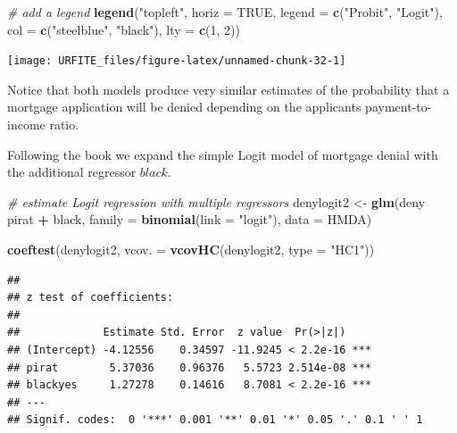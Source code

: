 \documentclass[]{book}
\newenvironment{Shaded}{\begin{snugshade}}{\end{snugshade}}
\newcommand{\KeywordTok}[1]{\textcolor[rgb]{0.13,0.29,0.53}{\textbf{#1}}}
\newcommand{\DataTypeTok}[1]{\textcolor[rgb]{0.13,0.29,0.53}{#1}}
\newcommand{\DecValTok}[1]{\textcolor[rgb]{0.00,0.00,0.81}{#1}}
\newcommand{\StringTok}[1]{\textcolor[rgb]{0.31,0.60,0.02}{#1}}
\newcommand{\CommentTok}[1]{\textcolor[rgb]{0.56,0.35,0.01}{\textit{#1}}}
\newcommand{\OtherTok}[1]{\textcolor[rgb]{0.56,0.35,0.01}{#1}}
\newcommand{\OperatorTok}[1]{\textcolor[rgb]{0.81,0.36,0.00}{\textbf{#1}}}
\newcommand{\NormalTok}[1]{#1}
\theoremstyle{definition}
\theoremstyle{definition}
\theoremstyle{definition}
\theoremstyle{remark}
\begin{document}
\begin{Shaded}
\begin{Highlighting}[]
\CommentTok{# add a legend}
\KeywordTok{legend}\NormalTok{(}\StringTok{"topleft"}\NormalTok{,}
       \DataTypeTok{horiz =} \OtherTok{TRUE}\NormalTok{,}
       \DataTypeTok{legend =} \KeywordTok{c}\NormalTok{(}\StringTok{"Probit"}\NormalTok{, }\StringTok{"Logit"}\NormalTok{),}
       \DataTypeTok{col =} \KeywordTok{c}\NormalTok{(}\StringTok{"steelblue"}\NormalTok{, }\StringTok{"black"}\NormalTok{), }
       \DataTypeTok{lty =} \KeywordTok{c}\NormalTok{(}\DecValTok{1}\NormalTok{, }\DecValTok{2}\NormalTok{))}
\end{Highlighting}
\end{Shaded}

\begin{center}\texttt{[image: URFITE\_files/figure-latex/unnamed-chunk-32-1]} \end{center}

Notice that both models produce very similar estimates of the
probability that a mortgage application will be denied depending on the
applicants payment-to-income ratio.

Following the book we expand the simple Logit model of mortgage denial
with the additional regressor \(black\).

\begin{Shaded}
\begin{Highlighting}[]
\CommentTok{# estimate Logit regression with multiple regressors}
\NormalTok{denylogit2 <-}\StringTok{ }\KeywordTok{glm}\NormalTok{(deny }\OperatorTok{~}\StringTok{ }\NormalTok{pirat }\OperatorTok{+}\StringTok{ }\NormalTok{black, }
                \DataTypeTok{family =} \KeywordTok{binomial}\NormalTok{(}\DataTypeTok{link =} \StringTok{"logit"}\NormalTok{), }
                \DataTypeTok{data =}\NormalTok{ HMDA)}

\KeywordTok{coeftest}\NormalTok{(denylogit2, }\DataTypeTok{vcov. =} \KeywordTok{vcovHC}\NormalTok{(denylogit2, }\DataTypeTok{type =} \StringTok{"HC1"}\NormalTok{))}
\end{Highlighting}
\end{Shaded}

\begin{verbatim}
## 
## z test of coefficients:
## 
##             Estimate Std. Error  z value  Pr(>|z|)    
## (Intercept) -4.12556    0.34597 -11.9245 < 2.2e-16 ***
## pirat        5.37036    0.96376   5.5723 2.514e-08 ***
## blackyes     1.27278    0.14616   8.7081 < 2.2e-16 ***
## ---
## Signif. codes:  0 '***' 0.001 '**' 0.01 '*' 0.05 '.' 0.1 ' ' 1
\end{verbatim}
\end{document}
